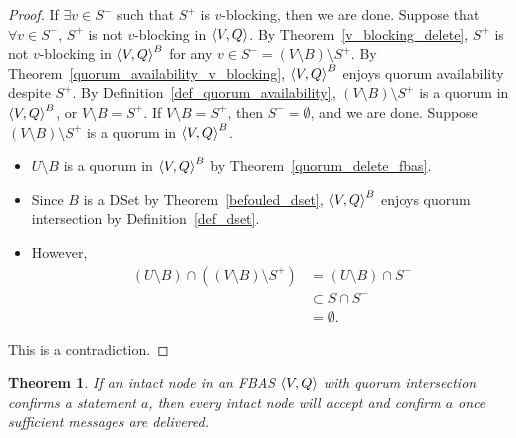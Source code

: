 \documentclass[12pt, psamsfonts]{amsart}
\newtheorem{thm}{Theorem}[subsection]
\theoremstyle{definition}
\theoremstyle{remark}
\numberwithin{equation}{subsection}
\begin{document}
\begin{proof}
    If $\exists v \in S^{-}$ such that $S^{+}$ is $v$-blocking, then we are done.
    Suppose that $\forall v \in S^{-}$, $S^{+}$ is not $v$-blocking in $\ev{V, Q}$.
    By Theorem~\ref{v_blocking_delete}, $S^{+}$ is not $v$-blocking in $\ev{V, Q}^B$ for any $v \in S^{-} = (V \setminus B) \setminus S^{+}$.
    By Theorem~\ref{quorum_availability_v_blocking}, $\ev{V, Q}^B$ enjoys quorum availability despite $S^{+}$.
    By Definition~\ref{def_quorum_availability}, $(V \setminus B) \setminus S^{+}$ is a quorum in $\ev{V, Q}^B$, or $V \setminus B = S^{+}$.
    If $V \setminus B = S^{+}$, then $S^{-} = \emptyset$, and we are done.
    Suppose $(V \setminus B) \setminus S^{+}$ is a quorum in $\ev{V, Q}^B$.
    \begin{itemize}
        \item
            $U \setminus B$ is a quorum in $\ev{V, Q}^B$ by Theorem~\ref{quorum_delete_fbas}.
        \item
            Since $B$ is a DSet by Theorem~\ref{befouled_dset}, $\ev{V, Q}^B$ enjoys quorum intersection by Definition~\ref{def_dset}.
        \item
            However,
            \begin{align*}
                (U \setminus B) \cap ((V \setminus B) \setminus S^{+})
                    &= (U \setminus B) \cap S^{-} \\
                    &\subset S \cap S^{-} \\
                    &= \emptyset.
            \end{align*}
    \end{itemize}
    This is a contradiction.
\end{proof}

\begin{thm}
    If an intact node in an FBAS $\ev{V, Q}$ with quorum intersection confirms a statement $a$, then every intact node will accept and confirm $a$ once sufficient messages are delivered.
\end{thm}
\end{document}
